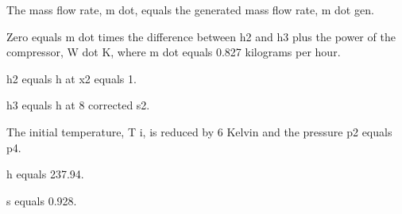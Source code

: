 The mass flow rate, m dot, equals the generated mass flow rate, m dot gen.

Zero equals m dot times the difference between h2 and h3 plus the power of the compressor, W dot K, where m dot equals 0.827 kilograms per hour.

h2 equals h at x2 equals 1.

h3 equals h at 8 corrected s2.

The initial temperature, T i, is reduced by 6 Kelvin and the pressure p2 equals p4.

h equals 237.94.

s equals 0.928.